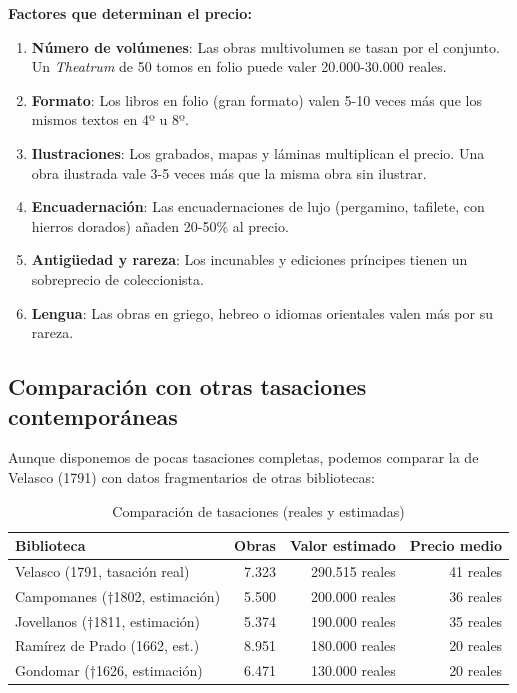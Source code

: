 \documentclass[11pt,a4paper]{article}
\begin{document}
\textbf{Factores que determinan el precio:}

\begin{enumerate}
\item \textbf{Número de volúmenes}: Las obras multivolumen se tasan por el conjunto. Un \textit{Theatrum} de 50 tomos en folio puede valer 20.000-30.000 reales.

\item \textbf{Formato}: Los libros en folio (gran formato) valen 5-10 veces más que los mismos textos en 4º u 8º.

\item \textbf{Ilustraciones}: Los grabados, mapas y láminas multiplican el precio. Una obra ilustrada vale 3-5 veces más que la misma obra sin ilustrar.

\item \textbf{Encuadernación}: Las encuadernaciones de lujo (pergamino, tafilete, con hierros dorados) añaden 20-50\% al precio.

\item \textbf{Antigüedad y rareza}: Los incunables y ediciones príncipes tienen un sobreprecio de coleccionista.

\item \textbf{Lengua}: Las obras en griego, hebreo o idiomas orientales valen más por su rareza.
\end{enumerate}

\subsection{Comparación con otras tasaciones contemporáneas}

Aunque disponemos de pocas tasaciones completas, podemos comparar la de Velasco (1791) con datos fragmentarios de otras bibliotecas:

\begin{table}[h]
\centering
\begin{tabular}{lrrr}
\toprule
\textbf{Biblioteca} & \textbf{Obras} & \textbf{Valor estimado} & \textbf{Precio medio} \\
\midrule
Velasco (1791, tasación real) & 7.323 & 290.515 reales & 41 reales \\
Campomanes (†1802, estimación) & 5.500 & 200.000 reales & 36 reales \\
Jovellanos (†1811, estimación) & 5.374 & 190.000 reales & 35 reales \\
Ramírez de Prado (1662, est.) & 8.951 & 180.000 reales & 20 reales \\
Gondomar (†1626, estimación) & 6.471 & 130.000 reales & 20 reales \\
\bottomrule
\end{tabular}
\caption{Comparación de tasaciones (reales y estimadas)}
\end{table}
\end{document}
